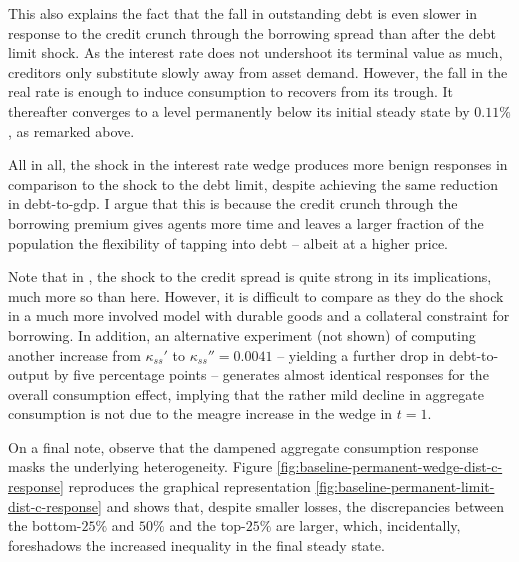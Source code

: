 \documentclass[a4paper,12pt]{article} %
\numberwithin{equation}{section} %
\numberwithin{figure}{section}
\numberwithin{table}{section}
\begin{document}
This also explains the fact that the fall in outstanding debt is even slower in response to the credit crunch through the borrowing spread than after the debt limit shock. As the interest rate does not undershoot its terminal value as much, creditors only substitute slowly away from asset demand. However, the fall in the real rate is enough to induce consumption to recovers from its trough. It thereafter converges to a level permanently below its initial steady state by $0.11\%$, as remarked above. 


All in all, the shock in the interest rate wedge produces more benign responses in comparison to the shock to the debt limit, despite achieving the same reduction in debt-to-\Gls{gdp}. I argue that this is because the credit crunch through the borrowing premium gives agents more time and leaves a larger fraction of the population the flexibility of tapping into debt -- albeit at a higher price.

Note that in \textcite{gl2017}, the shock to the credit spread is quite strong in its implications, much more so than here. However, it is difficult to compare as they do the shock in a much more involved model with durable goods and a collateral constraint for borrowing. In addition, an alternative experiment (not shown) of computing another increase from $\kappa_{ss}'$ to $\kappa_{ss}'' = 0.0041$ -- yielding a further drop in debt-to-output by five percentage points -- generates almost identical responses for the overall consumption effect, implying that the rather mild decline in aggregate consumption is not due to the meagre increase in the wedge in $t=1$.

On a final note, observe that the dampened aggregate consumption response masks the underlying heterogeneity. Figure \ref{fig:baseline-permanent-wedge-dist-c-response} reproduces the graphical representation \ref{fig:baseline-permanent-limit-dist-c-response} and shows that, despite smaller losses, the discrepancies between the bottom-$25\%$ and $50\%$ and the top-$25\%$ are larger, which, incidentally, foreshadows the increased inequality in the final steady state.
\end{document}
